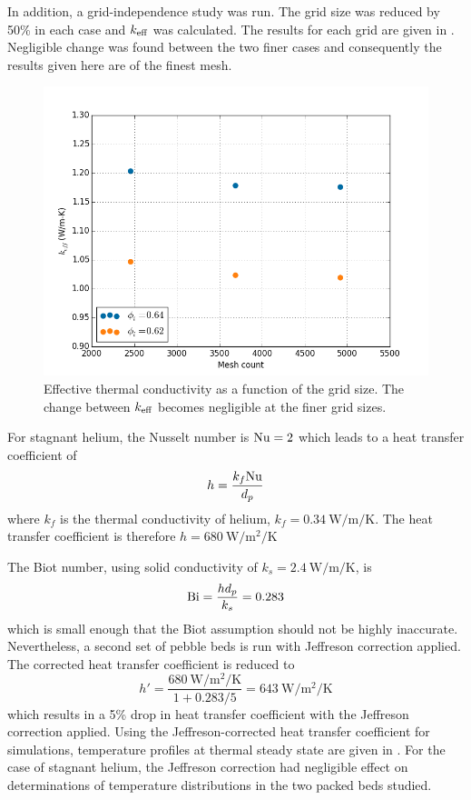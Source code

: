 In addition, a grid-independence study was run. The grid size was reduced by 50\% in each case and $k_\text{eff}$ was calculated. The results for each grid are given in . Negligible change was found between the two finer cases and consequently the results given here are of the finest mesh.

\begin{figure}[ht]
\centering
    \includegraphics[width=\singleimagewidth]{figures/cfd-grid-study.png}
    \caption{Effective thermal conductivity as a function of the grid size. The change between $k_\text{eff}$ becomes negligible at the finer grid sizes.}
    \label{fig:cfd-grid-study}
\end{figure}

For stagnant helium, the Nusselt number is $\mathrm{Nu} = 2$ which leads to a heat transfer coefficient of
\begin{equation}
h = \frac{k_f\mathrm{Nu}}{d_p}
\end{equation}
where $k_f$ is the thermal conductivity of helium, $k_f =\SI{0.34}{\watt\per\meter\per\kelvin}$. The heat transfer coefficient is therefore $h = \SI{680}{\watt\per\meter\squared\per\kelvin}$

The Biot number, using solid conductivity of $k_s =\SI{2.4}{\watt\per\meter\per\kelvin}$, is
\begin{equation}
\mathrm{Bi} = \frac{h d_p}{k_s} = 0.283
\end{equation}
which is small enough that the Biot assumption should not be highly inaccurate. Nevertheless, a second set of pebble beds is run with Jeffreson correction applied. The corrected heat transfer coefficient is reduced to
\begin{equation}
h' = \frac{\SI{680}{\watt\per\meter\squared\per\kelvin}}{1 + 0.283/5} = \SI{643}{\watt\per\meter\squared\per\kelvin}
\end{equation}
which results in a 5\% drop in heat transfer coefficient with the Jeffreson correction applied.
Using the Jeffreson-corrected heat transfer coefficient for simulations, temperature profiles at thermal steady state are given in . For the case of stagnant helium, the Jeffreson correction had negligible effect on determinations of temperature distributions in the two packed beds studied. 

